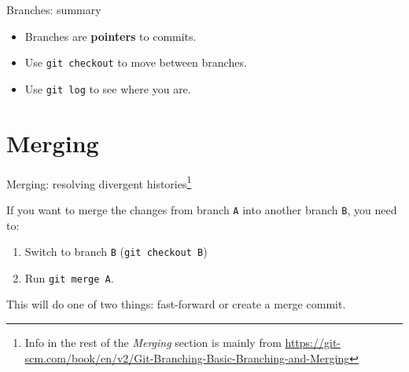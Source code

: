 \documentclass{beeper}
\begin{document}
\begin{frame}{Branches: summary}
    \begin{itemize}
        \item Branches are \textbf{pointers} to commits.
        \item Use \texttt{git checkout} to move between branches.
        \item Use \texttt{git log} to see where you are.
    \end{itemize}
\end{frame}

\section{Merging}

\begin{frame}{Merging: resolving divergent histories\footnote[frame]{Info in the rest of the
    \textit{Merging} section is mainly from
    \url{https://git-scm.com/book/en/v2/Git-Branching-Basic-Branching-and-Merging}}}

    If you want to merge the changes from branch \texttt{A} into another branch
    \texttt{B}, you need to:

    \begin{enumerate}
        \item Switch to branch \texttt{B} (\texttt{git checkout B})
        \item Run \texttt{git merge A}.
    \end{enumerate}

    This will do one of two things: fast-forward or create a merge commit.
\end{frame}
\end{document}
